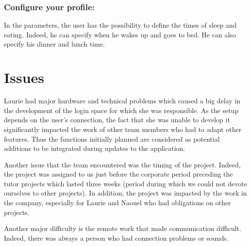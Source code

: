 \documentclass[a4paper,12pt]{article}
\begin{document}
\bigskip
\subsubsection*{Configure your profile:}
In the parameters, the user has the possibility to define the times of sleep and eating. Indeed, he can specify when he wakes up and goes to bed. He can also specify his dinner and lunch time.

\bigskip
\section*{Issues}

\bigskip
Laurie had major hardware and technical problems which caused a big delay in the development of the login space for which she was responsible. As the setup depends on the user's connection, the fact that she was unable to develop it significantly impacted the work of other team members who had to adapt other features. Thus the functions initially planned are considered as potential additions to be integrated during updates to the application.

\bigskip
Another issue that the team encountered was the timing of the project. Indeed, the project was assigned to us just before the corporate period preceding the tutor projects which lasted three weeks (period during which we could not devote ourselves to other projects). In addition, the project was impacted by the work in the company, especially for Laurie and Naouel who had obligations on other projects.

\bigskip
Another major difficulty is the remote work that made communication difficult. Indeed, there was always a person who had connection problems or sounds.


\bigskip
\end{document}
